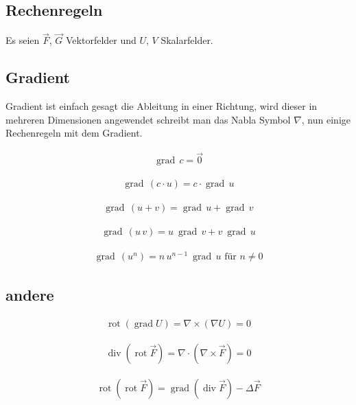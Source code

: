 \documentclass[a4paper, 10pt]{scrartcl}
\begin{document}
	\subsection{Rechenregeln}
	Es seien $\vec F$, $\vec G$ Vektorfelder und $U$, $V$ Skalarfelder.
	
	
	\subsection{Gradient}
	
	Gradient ist einfach gesagt die Ableitung in einer Richtung, wird dieser in mehreren Dimensionen angewendet schreibt man das Nabla Symbol $ \nabla $, nun einige Rechenregeln mit dem Gradient.
	
	\begin{align}
		\operatorname{grad}\,c=\vec{0}
	\end{align}
	
	\begin{align}
		\operatorname{grad}\,(c\cdot u)=c\cdot\operatorname{grad}\,u
	\end{align}
	
	\begin{align}
		\operatorname{grad}\,(u+v)=\operatorname{grad}\,u+\operatorname{grad}\,v
	\end{align}
	
	\begin{align}
		\operatorname{grad}\,(u\, v) = u\ \operatorname{grad}\,v + v\ \operatorname{grad}\,u
	\end{align}
	
	
	\begin{align}
		\label{eqn:ProduktregelEinesGradientMitPotenzen}
		\operatorname{grad}\,(u^n) = n\, u^{n-1}\ \operatorname{grad}\,u \text{ für } n\neq 0
	\end{align}
	
	
	\subsection{andere}
	\begin{align}
		\operatorname{rot}(\operatorname{grad}U)=\nabla \times (\nabla U) = 0
	\end{align}
	
	\begin{align}
		\operatorname{div}(\operatorname{rot}\vec{F}) = \nabla \cdot (\nabla \times
		\vec F) = 0
	\end{align}
	
	\begin{align}
		\operatorname{rot}(\operatorname{rot}\vec{F}) =
		\operatorname{grad}(\operatorname{div}\vec{F}) -\Delta \vec{F}
	\end{align}
	
\end{document}
